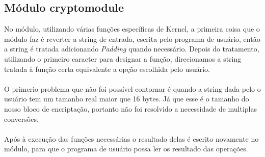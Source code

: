 \subsection{Módulo cryptomodule}
No módulo, utilizando várias funções específicas de Kernel, a primeira coisa que o módulo faz é reverter a string de entrada, escrita pelo programa de usuário, então a string é tratada adicionando \emph{Padding} quando necessário.
Depois do tratamento, utilizando o primeiro caracter para designar a função, direcionamos a string tratada à função certa equivalente a opção escolhida pelo usuário.
\\\\
O primerio problema que não foi possível contornar é quando a string dada pelo o usuário tem um tamanho real maior que 16 bytes. Já que esse é o tamanho do nosso bloco de encriptação, portanto não foi resolvido a necessidade de multiplas conversões.
\\
\\
Após à execução das funções necessárias o resultado delas é escrito novamente no módulo, para que o programa de usuário possa ler os resultado das operações.



